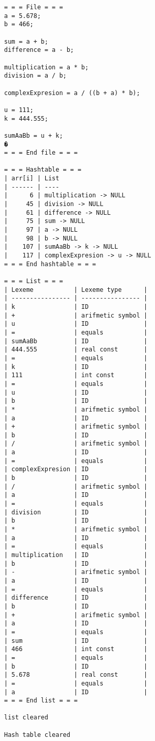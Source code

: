 \begin{lstlisting}[language=Out,]
= = = File = = =
a = 5.678;
b = 466;

sum = a + b;
difference = a - b;

multiplication = a * b;
division = a / b;

complexExpresion = a / ((b + a) * b);

u = 111;
k = 444.555;

sumAaBb = u + k;
�
= = = End file = = =

= = = Hashtable = = =
| arr[i] | List
| ------ | ----
|      6 | multiplication -> NULL
|     45 | division -> NULL
|     61 | difference -> NULL
|     75 | sum -> NULL
|     97 | a -> NULL
|     98 | b -> NULL
|    107 | sumAaBb -> k -> NULL
|    117 | complexExpresion -> u -> NULL
= = = End hashtable = = =

= = = List = = =
| Lexeme           | Lexeme type      |
| ---------------- | ---------------- |
| k                | ID               |
| +                | arifmetic symbol |
| u                | ID               |
| =                | equals           |
| sumAaBb          | ID               |
| 444.555          | real const       |
| =                | equals           |
| k                | ID               |
| 111              | int const        |
| =                | equals           |
| u                | ID               |
| b                | ID               |
| *                | arifmetic symbol |
| a                | ID               |
| +                | arifmetic symbol |
| b                | ID               |
| /                | arifmetic symbol |
| a                | ID               |
| =                | equals           |
| complexExpresion | ID               |
| b                | ID               |
| /                | arifmetic symbol |
| a                | ID               |
| =                | equals           |
| division         | ID               |
| b                | ID               |
| *                | arifmetic symbol |
| a                | ID               |
| =                | equals           |
| multiplication   | ID               |
| b                | ID               |
| -                | arifmetic symbol |
| a                | ID               |
| =                | equals           |
| difference       | ID               |
| b                | ID               |
| +                | arifmetic symbol |
| a                | ID               |
| =                | equals           |
| sum              | ID               |
| 466              | int const        |
| =                | equals           |
| b                | ID               |
| 5.678            | real const       |
| =                | equals           |
| a                | ID               |
= = = End list = = =

list cleared

Hash table cleared
\end{lstlisting}
